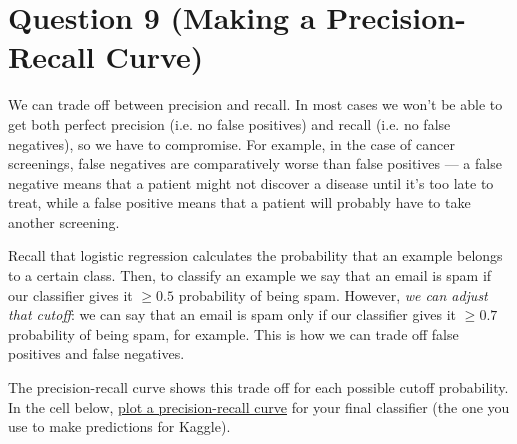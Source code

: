 \documentclass[11pt]{article}
\begin{document}
    \section{Question 9 (Making a Precision-Recall
Curve)}\label{question-9-making-a-precision-recall-curve}

We can trade off between precision and recall. In most cases we won't be
able to get both perfect precision (i.e. no false positives) and recall
(i.e. no false negatives), so we have to compromise. For example, in the
case of cancer screenings, false negatives are comparatively worse than
false positives --- a false negative means that a patient might not
discover a disease until it's too late to treat, while a false positive
means that a patient will probably have to take another screening.

Recall that logistic regression calculates the probability that an
example belongs to a certain class. Then, to classify an example we say
that an email is spam if our classifier gives it \(\ge 0.5\) probability
of being spam. However, \emph{we can adjust that cutoff}: we can say
that an email is spam only if our classifier gives it \(\ge 0.7\)
probability of being spam, for example. This is how we can trade off
false positives and false negatives.

The precision-recall curve shows this trade off for each possible cutoff
probability. In the cell below,
\href{http://scikit-learn.org/stable/auto_examples/model_selection/plot_precision_recall.html\#plot-the-precision-recall-curve}{plot
a precision-recall curve} for your final classifier (the one you use to
make predictions for Kaggle).
\end{document}
